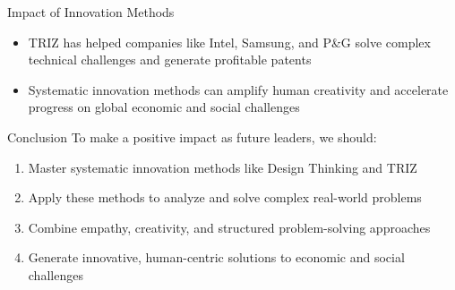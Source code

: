 \documentclass[final]{beamer}
\begin{document}
\begin{frame}{}
\begin{columns}[t]
\begin{column}{.3\linewidth}
\begin{block}{Impact of Innovation Methods}
\begin{itemize}
					\item TRIZ has helped companies like Intel, Samsung, and P\&G solve complex technical challenges and generate profitable patents
					\item Systematic innovation methods can amplify human creativity and accelerate progress on global economic and social challenges
				\end{itemize}
			\end{block}
			\vspace{1cm}
			\begin{block}{Conclusion}
				To make a positive impact as future leaders, we should:
				\begin{enumerate}
					\item Master systematic innovation methods like Design Thinking and TRIZ
					\item Apply these methods to analyze and solve complex real-world problems
					\item Combine empathy, creativity, and structured problem-solving approaches
					\item Generate innovative, human-centric solutions to economic and social challenges
				\end{enumerate}
			\end{block}

		\end{column}
	\end{columns}

\end{frame}
\end{document}

